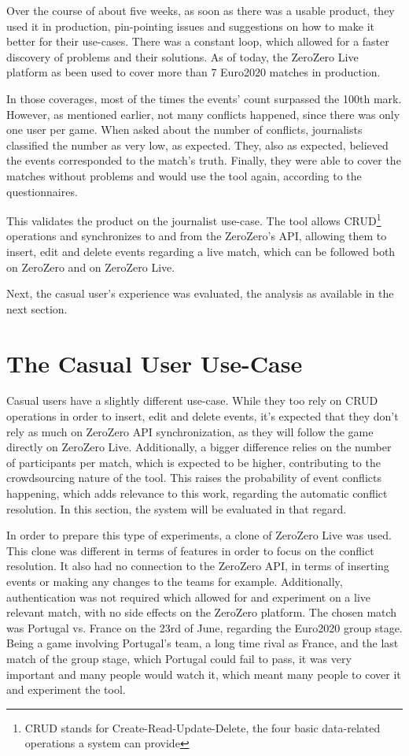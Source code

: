 Over the course of about five weeks, as soon as there was a usable product, they used it in production, pin-pointing issues and suggestions on how to make it better for their use-cases. There was a constant  loop, which allowed for a faster discovery of problems and their solutions. As of today, the ZeroZero Live platform as been used to cover more than 7 Euro2020 matches in production.

In those coverages, most of the times the events' count surpassed the 100th mark. However, as mentioned earlier, not many conflicts happened, since there was only one user per game.
When asked about the number of conflicts, journalists classified the number as very low, as expected. They, also as expected, believed the events corresponded to the match's truth. Finally, they were able to cover the matches without problems and would use the tool again, according to the questionnaires.

This validates the product on the journalist use-case. The tool allows CRUD\footnote{CRUD stands for Create-Read-Update-Delete, the four basic data-related operations a system can provide} operations and synchronizes to and from the ZeroZero's API, allowing them to insert, edit and delete events regarding a live match, which can be followed both on ZeroZero and on ZeroZero Live.

Next, the casual user's experience was evaluated, the analysis as available in the next section.

\section{The Casual User Use-Case}

Casual users have a slightly different use-case. While they too rely on CRUD operations in order to insert, edit and delete events, it's expected that they don't rely as much on ZeroZero API synchronization, as they will follow the game directly on ZeroZero Live. Additionally, a bigger difference relies on the number of participants per match, which is expected to be higher, contributing to the crowdsourcing nature of the tool. This raises the probability of event conflicts happening, which adds relevance to this work, regarding the automatic conflict resolution. In this section, the system will be evaluated in that regard.

In order to prepare this type of experiments, a clone of ZeroZero Live was used. This clone was different in terms of features in order to focus on the conflict resolution. It also had no connection to the ZeroZero API, in terms of inserting events or making any changes to the teams for example. Additionally, authentication was not required which allowed for and experiment on a live relevant match, with no side effects on the ZeroZero platform. The chosen match was Portugal vs. France on the 23rd of June, regarding the Euro2020 group stage. Being a game involving Portugal's team, a long time rival as France, and the last match of the group stage, which Portugal could fail to pass, it was very important and many people would watch it, which meant many people to cover it and experiment the tool.

